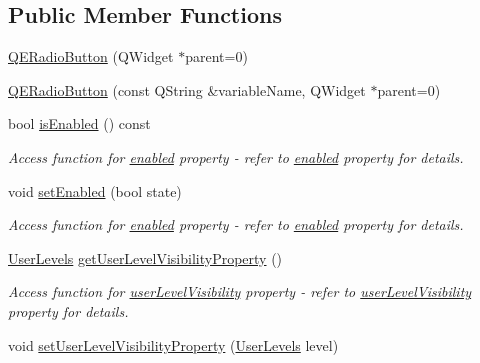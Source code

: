 \subsection*{Public Member Functions}
\begin{DoxyCompactItemize}
\item 
\hyperlink{classQERadioButton_a9b0085b628f4567a0205cfbdb85cf254}{QERadioButton} (QWidget $\ast$parent=0)
\item 
\hyperlink{classQERadioButton_a142cefe6bed071c0ebbf4dd705e7eb3f}{QERadioButton} (const QString \&variableName, QWidget $\ast$parent=0)
\item 
\hypertarget{classQERadioButton_a5e0d84dee0962472b0df7e54534e1f8e}{
bool \hyperlink{classQERadioButton_a5e0d84dee0962472b0df7e54534e1f8e}{isEnabled} () const }
\label{classQERadioButton_a5e0d84dee0962472b0df7e54534e1f8e}

\begin{DoxyCompactList}\small\item\em Access function for \hyperlink{classQERadioButton_a4d5d822fbcbc310e5e126aad54e49cdd}{enabled} property -\/ refer to \hyperlink{classQERadioButton_a4d5d822fbcbc310e5e126aad54e49cdd}{enabled} property for details. \end{DoxyCompactList}\item 
\hypertarget{classQERadioButton_ae9fd80c0adb900c2024485aa8cbb3b80}{
void \hyperlink{classQERadioButton_ae9fd80c0adb900c2024485aa8cbb3b80}{setEnabled} (bool state)}
\label{classQERadioButton_ae9fd80c0adb900c2024485aa8cbb3b80}

\begin{DoxyCompactList}\small\item\em Access function for \hyperlink{classQERadioButton_a4d5d822fbcbc310e5e126aad54e49cdd}{enabled} property -\/ refer to \hyperlink{classQERadioButton_a4d5d822fbcbc310e5e126aad54e49cdd}{enabled} property for details. \end{DoxyCompactList}\item 
\hypertarget{classQERadioButton_a34b0cb9285265b597d39285e8480a914}{
\hyperlink{classQERadioButton_abce53396b682b1c32d9909a34620cb50}{UserLevels} \hyperlink{classQERadioButton_a34b0cb9285265b597d39285e8480a914}{getUserLevelVisibilityProperty} ()}
\label{classQERadioButton_a34b0cb9285265b597d39285e8480a914}

\begin{DoxyCompactList}\small\item\em Access function for \hyperlink{classQERadioButton_a707c662aa4b125d0fc54c9eae4471a0d}{userLevelVisibility} property -\/ refer to \hyperlink{classQERadioButton_a707c662aa4b125d0fc54c9eae4471a0d}{userLevelVisibility} property for details. \end{DoxyCompactList}\item 
\hypertarget{classQERadioButton_a990443ac603b3822c8a58991948b1654}{
void \hyperlink{classQERadioButton_a990443ac603b3822c8a58991948b1654}{setUserLevelVisibilityProperty} (\hyperlink{classQERadioButton_abce53396b682b1c32d9909a34620cb50}{UserLevels} level)}
\label{classQERadioButton_a990443ac603b3822c8a58991948b1654}


\end{DoxyCompactItemize}
